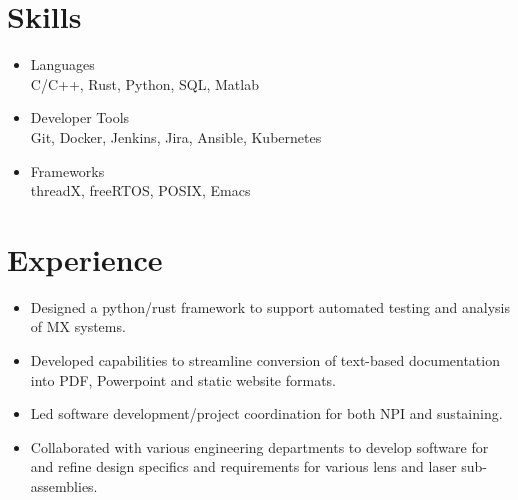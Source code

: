 \documentclass[a4paper,ragged2e,withhyper]{altacv}
\begin{document}
{\section{Skills}
\label{sec:org273d25d}
\begin{itemize}
\item Languages\\
C/C++, Rust, Python, SQL, Matlab\\
\item Developer Tools\\
Git, Docker, Jenkins, Jira, Ansible, Kubernetes\\
\item Frameworks\\
threadX, freeRTOS, POSIX, Emacs\\
\end{itemize}

}
\section{Experience}
\label{sec:orgcced417}


\begin{itemize}
\item Designed a python/rust framework to support automated testing and analysis of MX systems.\\
\item Developed capabilities to streamline conversion of text-based documentation into PDF, Powerpoint and static website formats.\\
\item Led software development/project coordination for both NPI and sustaining.\\
\item Collaborated with various engineering departments to develop software for and refine design specifics and requirements for various lens and laser sub-assemblies.\\
\end{itemize}

\divider
\end{document}
